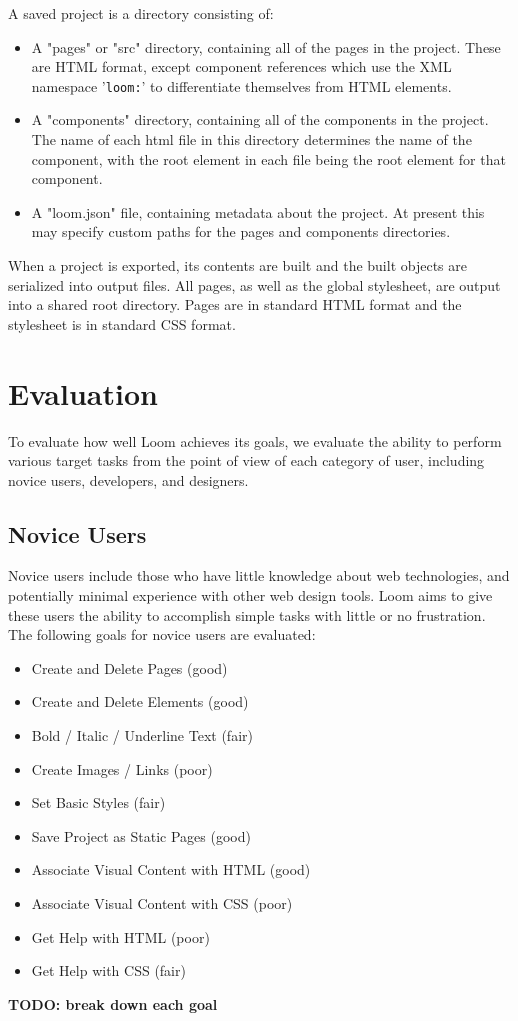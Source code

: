 \documentclass[conference, letterpaper]{IEEEtran}
\begin{document}
A saved project is a directory consisting of:
\begin{itemize}
  \item A "pages" or "src" directory, containing all of the pages in the project. These are HTML format, except component references which use the XML namespace '\texttt{loom:}' to differentiate themselves from HTML elements.
  \item A "components" directory, containing all of the components in the project. The name of each html file in this directory determines the name of the component, with the root element in each file being the root element for that component.
  \item A "loom.json" file, containing metadata about the project. At present this may specify custom paths for the pages and components directories.
\end{itemize}

When a project is exported, its contents are built and the built objects are serialized into output files. All pages, as well as the global stylesheet, are output into a shared root directory. Pages are in standard HTML format and the stylesheet is in standard CSS format.

\section{Evaluation}
To evaluate how well Loom achieves its goals, we evaluate the ability to perform various target tasks from the point of view of each category of user, including novice users, developers, and designers.

\subsection{Novice Users}
Novice users include those who have little knowledge about web technologies, and potentially minimal experience with other web design tools. Loom aims to give these users the ability to accomplish simple tasks with little or no frustration. The following goals for novice users are evaluated:
\begin{itemize}
  \item Create and Delete Pages (good)
  \item Create and Delete Elements (good)
  \item Bold / Italic / Underline Text (fair)
  \item Create Images / Links (poor)
  \item Set Basic Styles (fair)
  \item Save Project as Static Pages (good)
  \item Associate Visual Content with HTML (good)
  \item Associate Visual Content with CSS (poor)
  \item Get Help with HTML (poor)
  \item Get Help with CSS (fair)
\end{itemize}
\textbf{TODO: break down each goal}
\end{document}
